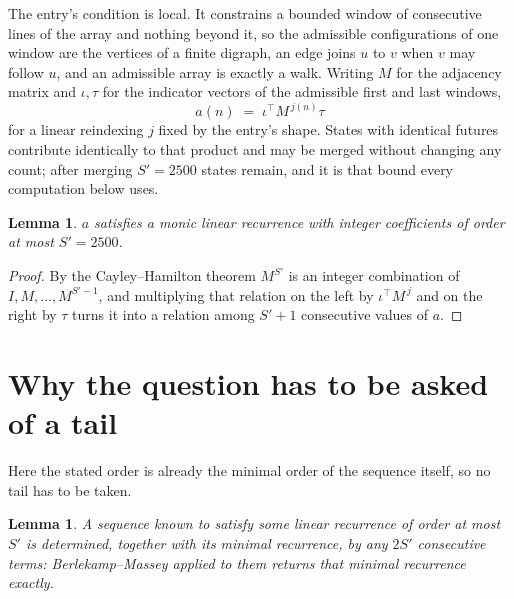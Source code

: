 \documentclass[11pt,a4paper]{article}
\theoremstyle{plain}
\newtheorem{lemma}[theorem]{Lemma}
\theoremstyle{definition}
\begin{document}
The entry's condition is local. It constrains a bounded window of consecutive lines of the
array and nothing beyond it, so the admissible configurations of one window are the vertices of
a finite digraph, an edge joins $u$ to $v$ when $v$ may follow $u$, and an admissible array is
exactly a walk. Writing $M$ for the adjacency matrix and $\iota,\tau$ for the indicator vectors
of the admissible first and last windows,
\[
a(n)\;=\;\iota^{\!\top}M^{\,j(n)}\tau
\]
for a linear reindexing $j$ fixed by the entry's shape. States with identical futures
contribute identically to that product and may be merged without changing any count; after
merging $S'=2500$ states remain, and it is that bound every computation below uses.

\begin{lemma}\label{lem:cf}
$a$ satisfies a monic linear recurrence with integer coefficients of order at most $S'=2500$.
\end{lemma}

\begin{proof}
By the Cayley--Hamilton theorem $M^{S'}$ is an integer combination of $I,M,\dots,M^{S'-1}$,
and multiplying that relation on the left by $\iota^{\!\top}M^{\,j}$ and on the right by
$\tau$ turns it into a relation among $S'+1$ consecutive values of $a$.
\end{proof}

\section{Why the question has to be asked of a tail}

Here the stated order is already the minimal order of the sequence itself, so no tail has to be taken.

\begin{lemma}\label{lem:bm}
A sequence known to satisfy some linear recurrence of order at most $S'$ is determined,
together with its minimal recurrence, by any $2S'$ consecutive terms: Berlekamp--Massey applied
to them returns that minimal recurrence exactly.
\end{lemma}
\end{document}
